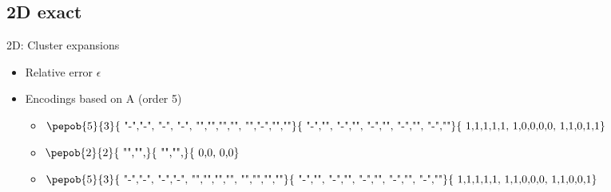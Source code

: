 \subsection{2D exact}

\begin{frame}{2D: Cluster expansions}

    \begin{minipage}{.6\textwidth}
        \begin{itemize}
            \item Relative error $\epsilon$
            \item Encodings based on A (order 5)
                  \begin{itemize}
                      \item {}$\vcenter{\hbox{\pepob{5}{3}{{
                                                    "-","-", "-",     "-",
                                                    "","","","",
                                                    "","-","",""}}{{
                                                    "-","",
                                                    "-","",
                                                    "-","",
                                                    "-","",
                                                    "-",""}}{{
                                                    1,1,1,1,1,
                                                    1,0,0,0,0,
                                                    1,1,0,1,1}} }} $
                      \item {}$\vcenter{\hbox{{\pepob{2}{2}{{
                                                            "","",}}{{
                                                            "","",}}{{
                                                            0,0,
                                                            0,0}}} }}$
                      \item {}$\vcenter{\hbox{\pepob{5}{3}{{
                                                    "-","-", "-","-",
                                                    "","","","",
                                                    "","","",""}}{{
                                                    "-","",
                                                    "-","",
                                                    "-","",
                                                    "-","",
                                                    "-",""}}{{
                                                    1,1,1,1,1,
                                                    1,1,0,0,0,
                                                    1,1,0,0,1}} }} $
                  \end{itemize}
        \end{itemize}


\end{minipage}
\end{frame}

